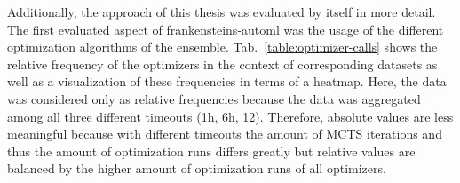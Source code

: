Additionally, the approach of this thesis was evaluated by itself in more detail.
The first evaluated aspect of frankensteins-automl was the usage of the different optimization algorithms of the ensemble.\newline
Tab.~\ref{table:optimizer-calls} shows the relative frequency of the optimizers in the context of corresponding datasets as well as a visualization of these frequencies in terms of a heatmap.
Here, the data was considered only as relative frequencies because the data was aggregated among all three different timeouts (1h, 6h, 12).
Therefore, absolute values are less meaningful because with different timeouts the amount of MCTS iterations and thus the amount of optimization runs differs greatly but relative values are balanced by the higher amount of optimization runs of all optimizers.


